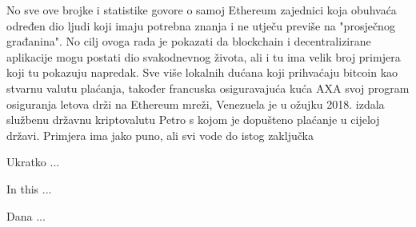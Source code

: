 \documentclass[a4paper,oneside,12pt]{memoir} %
\begin{document}
No sve ove brojke i statistike govore o samoj Ethereum zajednici koja obuhvaća određen dio ljudi koji imaju potrebna znanja i ne utječu previše na "prosječnog građanina". No cilj ovoga rada je pokazati da blockchain i decentralizirane aplikacije mogu postati dio svakodnevnog života, ali i tu ima velik broj primjera koji tu pokazuju napredak. Sve više lokalnih dućana koji prihvaćaju bitcoin kao stvarnu valutu plaćanja, također francuska osiguravajuća kuća AXA svoj program osiguranja letova drži na Ethereum mreži\cite{axa}, Venezuela je u ožujku 2018. izdala službenu državnu kriptovalutu Petro s kojom je dopušteno plaćanje u cijeloj državi. Primjera ima jako puno, ali svi vode do istog zaključka 



\pagestyle{empty} %


\begin{sazetak}
Ukratko ...
\end{sazetak}

\begin{summary}
In this ...
\end{summary}


\begin{cv}
Dana ...
\end{cv}
\end{document}
